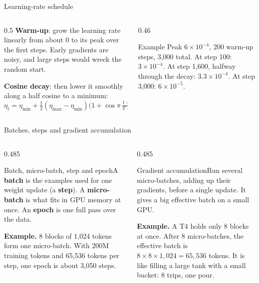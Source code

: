 \documentclass[aspectratio=169,11pt]{beamer}
\newcommand{\term}[3]{%
  \begin{block}{#1}\small #2\par\vspace{1mm}%
  {\color{exgreen}\textbf{Example.}} #3\end{block}}
\newcommand{\twoterms}[6]{%
  \begin{columns}[T]
    \begin{column}{0.485\textwidth}\term{#1}{#2}{#3}\end{column}
    \begin{column}{0.485\textwidth}\term{#4}{#5}{#6}\end{column}
  \end{columns}}
\begin{document}
\begin{frame}{Learning-rate schedule}
  \begin{columns}[T]
    \begin{column}{0.5\textwidth}
      \small
      \textbf{Warm-up}: grow the learning rate linearly from about 0 to its peak over the first steps. Early gradients are noisy, and large steps would wreck the random start.
      \vspace{2mm}

      \textbf{Cosine decay}: then lower it smoothly along a half cosine to a minimum:
      \[
        \eta_t=\eta_{\min}+\tfrac12(\eta_{\max}-\eta_{\min})\big(1+\cos\pi\,\tfrac{t-t_w}{T-t_w}\big)
      \]
    \end{column}
    \begin{column}{0.46\textwidth}
      \centering
      \begin{exampleblock}{Example}
        \small
        Peak $6\times10^{-4}$, 200 warm-up steps, 3,000 total. At step 100: $3\times10^{-4}$. At step 1,600, halfway through the decay: $3.3\times10^{-4}$. At step 3,000: $6\times10^{-5}$.
      \end{exampleblock}
    \end{column}
  \end{columns}
\end{frame}

\begin{frame}{Batches, steps and gradient accumulation}
  \twoterms{Batch, micro-batch, step and epoch}
  {A \textbf{batch} is the examples used for one weight update (a \textbf{step}). A \textbf{micro-batch} is what fits in GPU memory at once. An \textbf{epoch} is one full pass over the data.}
  {8 blocks of 1,024 tokens form one micro-batch. With 200M training tokens and 65,536 tokens per step, one epoch is about 3,050 steps.}
  {Gradient accumulation}
  {Run several micro-batches, adding up their gradients, before a single update. It gives a big effective batch on a small GPU.}
  {A T4 holds only 8 blocks at once. After 8 micro-batches, the effective batch is $8\times8\times1{,}024=65{,}536$ tokens. It is like filling a large tank with a small bucket: 8 trips, one pour.}
\end{frame}
\end{document}

